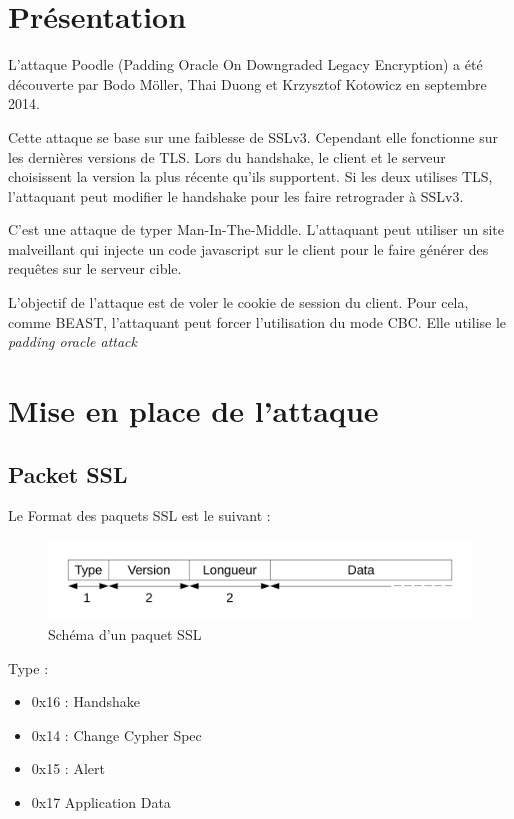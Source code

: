 
\chapter{Présentation}
\label{chapter:poodlePres}

L'attaque Poodle (Padding Oracle On Downgraded Legacy Encryption)
a été découverte par Bodo Möller, Thai Duong et 
Krzysztof Kotowicz\cite{article:ssl-poodle} en septembre 2014.

Cette attaque se base sur une faiblesse de SSLv3.
Cependant elle fonctionne sur les dernières versions de TLS.
Lors du handshake, le client et le serveur choisissent la version
la plus récente qu'ils supportent. Si les deux utilises TLS,
l'attaquant peut modifier le handshake pour les faire retrograder
à SSLv3.

C'est une attaque de typer Man-In-The-Middle.
L'attaquant peut utiliser un site malveillant qui injecte un
code javascript sur le client pour le faire générer des requêtes
sur le serveur cible.

L'objectif de l'attaque est de voler le cookie de session 
du client. Pour cela, comme BEAST, l'attaquant peut forcer 
l'utilisation du mode CBC. Elle utilise le \emph{padding oracle attack }

\chapter{Mise en place de l'attaque}
\label{chapter:Poodleattack}

\section{Packet SSL}
\label{sec:packet}

Le Format des paquets SSL est le suivant : 

\begin{figure}[h]
  \centering
  \includegraphics[scale=0.5]{schemaSSL.pdf}
  \caption{Schéma d'un paquet SSL}
  \label{fig:ssl}
\end{figure}


Type :
\begin{itemize}
\item 0x16 : Handshake
\item 0x14 : Change Cypher Spec
\item 0x15 : Alert
\item 0x17 Application Data
\end{itemize}

